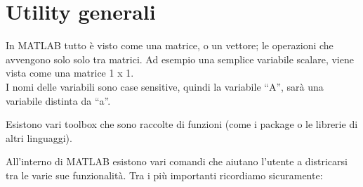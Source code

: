 \chapter{Utility generali}
In MATLAB tutto è visto come una matrice, o un vettore; le operazioni che avvengono solo solo tra matrici.
Ad esempio una semplice variabile scalare, viene vista come una matrice 1 x 1. \\

I nomi delle variabili sono case sensitive, quindi la variabile ``A'', sarà una variabile distinta da ``a''.

Esistono vari toolbox che sono raccolte di funzioni (come i package o le librerie di altri linguaggi).

All'interno di MATLAB esistono vari comandi che aiutano l'utente a districarsi tra le varie sue funzionalità.
Tra i più importanti ricordiamo sicuramente:

